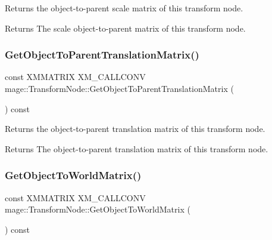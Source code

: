 Returns the object-\/to-\/parent scale matrix of this transform node.

\begin{DoxyReturn}{Returns}
The scale object-\/to-\/parent matrix of this transform node. 
\end{DoxyReturn}
\hypertarget{classmage_1_1_transform_node_a2695b6c661677eb8f019e7b0a538c4de}{}\label{classmage_1_1_transform_node_a2695b6c661677eb8f019e7b0a538c4de} 
\subsubsection{\texorpdfstring{Get\+Object\+To\+Parent\+Translation\+Matrix()}{GetObjectToParentTranslationMatrix()}}
{\footnotesize\ttfamily const X\+M\+M\+A\+T\+R\+IX X\+M\+\_\+\+C\+A\+L\+L\+C\+O\+NV mage\+::\+Transform\+Node\+::\+Get\+Object\+To\+Parent\+Translation\+Matrix (\begin{DoxyParamCaption}{ }\end{DoxyParamCaption}) const\hspace{0.3cm}{\ttfamily [noexcept]}}

Returns the object-\/to-\/parent translation matrix of this transform node.

\begin{DoxyReturn}{Returns}
The object-\/to-\/parent translation matrix of this transform node. 
\end{DoxyReturn}
\hypertarget{classmage_1_1_transform_node_aa984b3af4dbff225bc3890d58f71abe6}{}\label{classmage_1_1_transform_node_aa984b3af4dbff225bc3890d58f71abe6} 
\subsubsection{\texorpdfstring{Get\+Object\+To\+World\+Matrix()}{GetObjectToWorldMatrix()}}
{\footnotesize\ttfamily const X\+M\+M\+A\+T\+R\+IX X\+M\+\_\+\+C\+A\+L\+L\+C\+O\+NV mage\+::\+Transform\+Node\+::\+Get\+Object\+To\+World\+Matrix (\begin{DoxyParamCaption}{ }\end{DoxyParamCaption}) const\hspace{0.3cm}{\ttfamily [noexcept]}}

